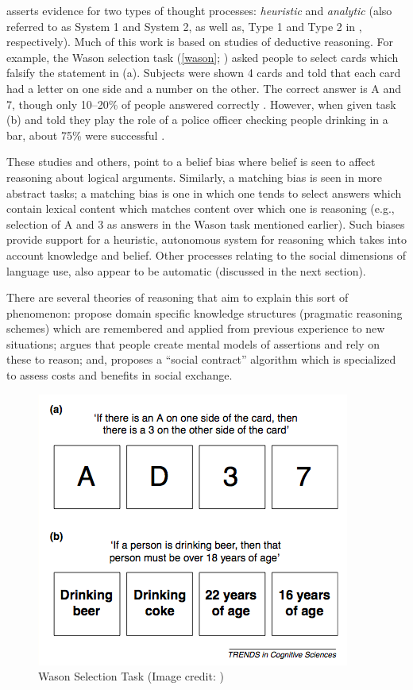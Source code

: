  \citet{Evans:2003gp}  asserts evidence for two types of thought processes: \emph{heuristic} and \emph{analytic} (also referred to as System 1 and System 2, as well as, Type 1 and Type 2 in  \citealp{Kahneman:2011tc,Manktelow:2012tx}, respectively).  Much of this work is based on studies of deductive reasoning. For example, the Wason selection task  (\autoref{wason}; \citealp{Wason:1960wt})  asked people to select cards which falsify the statement in (a). Subjects were shown 4 cards and told that each card had a letter on one side and a number on the other. The correct answer is A and 7, though only 10--20\% of people answered correctly  \citep{Wason:1960wt}.  However, when given task (b) and told they play the role of a police officer checking people drinking in a bar, about 75\% were successful  \citep{griggs1982elusive}.  

These studies and others, point to a belief bias where belief is seen to affect reasoning about logical arguments. Similarly, a matching bias is seen in more abstract tasks; a matching bias is one in which one tends to select answers which contain lexical content which matches content over which one is reasoning (e.g., selection of A and 3 as answers in the Wason task mentioned earlier). Such biases provide support for a heuristic, autonomous system for reasoning which takes into account knowledge and belief. Other processes relating to the social dimensions of language use, also appear to be automatic (discussed in the next section).

There are several theories of reasoning that aim to explain this sort of phenomenon:  \citet{Cheng:1985ww}  propose domain specific knowledge structures (pragmatic reasoning schemes) which are remembered and applied from previous experience to new situations;  \citep{JohnsonLaird:1983vt}  argues that people create mental models of assertions and rely on these to reason; and,  \citep{Cosmides:1989dq}  proposes a ``social contract'' algorithm which is specialized to assess costs and benefits in social exchange.


\begin{figure}
\centerline{
  \includegraphics[scale=.75]{chapter8.tex/wason}
  }
\caption{Wason Selection Task (Image credit: \citealp{Evans:2003gp})}
\label{wason}
\end{figure}


